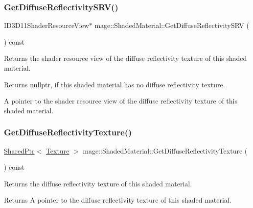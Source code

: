 \subsubsection{\texorpdfstring{Get\+Diffuse\+Reflectivity\+S\+R\+V()}{GetDiffuseReflectivitySRV()}}
{\footnotesize\ttfamily I\+D3\+D11\+Shader\+Resource\+View$\ast$ mage\+::\+Shaded\+Material\+::\+Get\+Diffuse\+Reflectivity\+S\+RV (\begin{DoxyParamCaption}{ }\end{DoxyParamCaption}) const\hspace{0.3cm}{\ttfamily [noexcept]}}

Returns the shader resource view of the diffuse reflectivity texture of this shaded material.

\begin{DoxyReturn}{Returns}
{\ttfamily nullptr}, if this shaded material has no diffuse reflectivity texture. 

A pointer to the shader resource view of the diffuse reflectivity texture of this shaded material. 
\end{DoxyReturn}
\hypertarget{structmage_1_1_shaded_material_a461a080a923578673ce04c83cc3d9dbd}{}\label{structmage_1_1_shaded_material_a461a080a923578673ce04c83cc3d9dbd} 
\subsubsection{\texorpdfstring{Get\+Diffuse\+Reflectivity\+Texture()}{GetDiffuseReflectivityTexture()}}
{\footnotesize\ttfamily \hyperlink{namespacemage_a1e01ae66713838a7a67d30e44c67703e}{Shared\+Ptr}$<$ \hyperlink{classmage_1_1_texture}{Texture} $>$ mage\+::\+Shaded\+Material\+::\+Get\+Diffuse\+Reflectivity\+Texture (\begin{DoxyParamCaption}{ }\end{DoxyParamCaption}) const\hspace{0.3cm}{\ttfamily [noexcept]}}

Returns the diffuse reflectivity texture of this shaded material.

\begin{DoxyReturn}{Returns}
A pointer to the diffuse reflectivity texture of this shaded material. 
\end{DoxyReturn}
\hypertarget{structmage_1_1_shaded_material_ac33beb240df46ad6295425851cafc996}{}\label{structmage_1_1_shaded_material_ac33beb240df46ad6295425851cafc996} 
